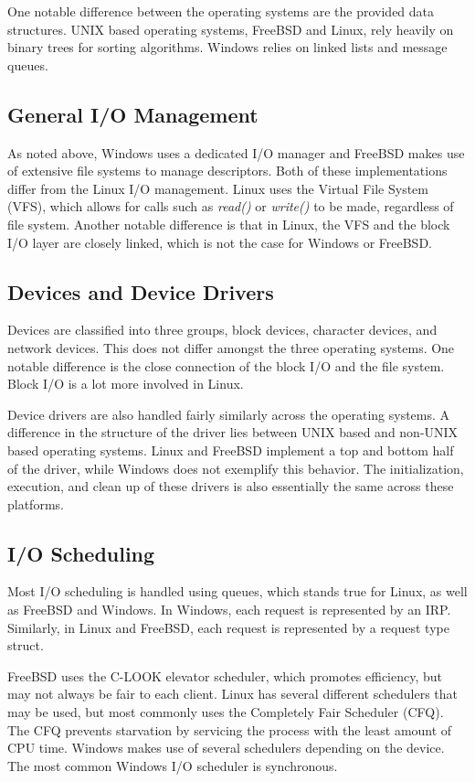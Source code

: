 \documentclass[10pt, onecolumn]{IEEEtran}
\begin{document}
        One notable difference between the operating systems are the provided data structures. UNIX based operating systems, FreeBSD and Linux, rely heavily on binary trees for sorting algorithms. Windows relies on linked lists and message queues.
        
        \subsection{General I/O Management}
            As noted above, Windows uses a dedicated I/O manager and FreeBSD makes use of extensive file systems to manage descriptors. Both of these implementations differ from the Linux I/O management. Linux uses the Virtual File System (VFS), which allows for calls such as \textit{read()} or \textit{write()} to be made, regardless of file system. Another notable difference is that in Linux, the VFS and the block I/O layer are closely linked, which is not the case for Windows or FreeBSD.
        
        \subsection{Devices and Device Drivers}
            Devices are classified into three groups, block devices, character devices, and network devices. This does not differ amongst the three operating systems. One notable difference is the close connection of the block I/O and the file system. Block I/O is a lot more involved in Linux.
            
            Device drivers are also handled fairly similarly across the operating systems. A difference in the structure of the driver lies between UNIX based and non-UNIX based operating systems. Linux and FreeBSD implement a top and bottom half of the driver, while Windows does not exemplify this behavior. The initialization, execution, and clean up of these drivers is also essentially the same across these platforms.
            
        \subsection{I/O Scheduling}
            Most I/O scheduling is handled using queues, which stands true for Linux, as well as FreeBSD and Windows. In Windows, each request is represented by an IRP. Similarly, in Linux and FreeBSD, each request is represented by a request type struct. 
            
            FreeBSD uses the C-LOOK elevator scheduler, which promotes efficiency, but may not always be fair to each client. Linux has several different schedulers that may be used, but most commonly uses the Completely Fair Scheduler (CFQ). The CFQ prevents starvation by servicing the process with the least amount of CPU time. Windows makes use of several schedulers depending on the device. The most common Windows I/O scheduler is synchronous.
        
\end{document}
